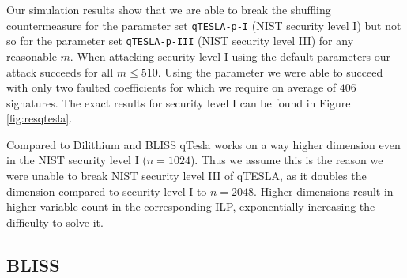 
Our simulation results show that we are able to break the shuffling countermeasure for the parameter set \texttt{qTESLA-p-I} (NIST security level I) but not so for the parameter set  \texttt{qTESLA-p-III}  (NIST security level III) for any reasonable $m$.
When attacking security level I using the default parameters our attack succeeds for all $m \leq 510$. Using the  parameter we were able to succeed with only two faulted coefficients for which we require on average of $406$ signatures. The exact results for security level I can be found in Figure \ref{fig:resqtesla}.
 
Compared to Dilithium and BLISS qTesla works on a way higher dimension even in the NIST security level I ($n = 1024$). Thus we assume this is the reason we were unable to break NIST security level III of qTESLA, as it doubles the dimension compared to security level I to $n = 2048$. Higher dimensions result in higher variable-count in the corresponding ILP, exponentially increasing the difficulty to solve it.

\subsection{BLISS}

